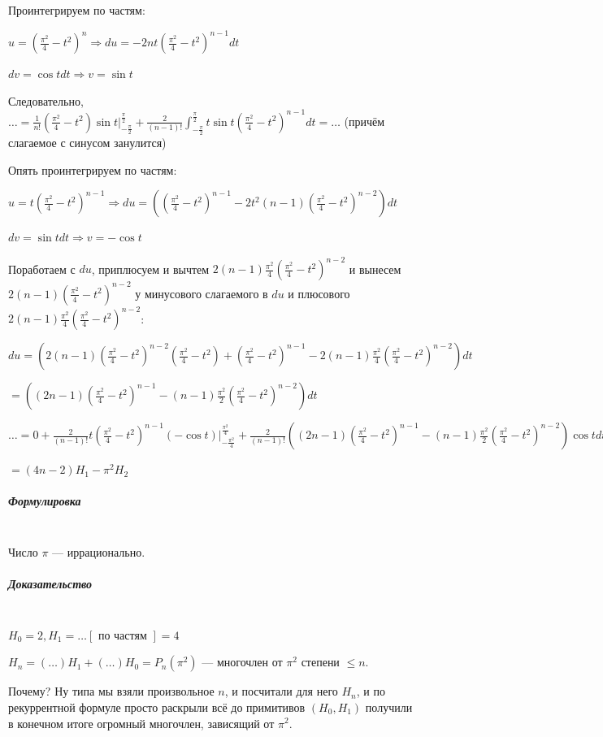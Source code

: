 \documentclass{article}
\let\vanillasubparagraph\subparagraph
\renewcommand{\subparagraph}[1]{\vanillasubparagraph{#1}\mbox{}\\}
\begin{document}
Проинтегрируем по частям:

$u = \left(\frac{\pi^2}{4} - t^2\right)^n \Rightarrow du = -2nt\left(\frac{\pi^2}{4} - t^2\right)^{n - 1}dt$

$dv = \cos t dt \Rightarrow v = \sin t$

Следовательно, $\ldots = \frac{1}{n!}\left(\frac{\pi^2}{4} - t^2\right)\sin t|_{-\frac{\pi}{2}}^{\frac{\pi}{2}} + \frac{2}{(n - 1)!}\int_{-\frac{\pi}{2}}^{\frac{\pi}{2}}{t\sin t \left(\frac{\pi^2}{4} - t^2\right)^{n - 1}dt} = \ldots$ (причём слагаемое с синусом занулится)

Опять проинтегрируем по частям:

$u = t\left(\frac{\pi^2}{4} - t^2\right)^{n - 1} \Rightarrow du = \left(\left(\frac{\pi^2}{4} - t^2\right)^{n - 1} - 2t^2(n - 1)\left(\frac{\pi^2}{4} - t^2\right)^{n - 2}\right)dt$

$dv = \sin t dt \Rightarrow v = -\cos t$

Поработаем с $du$, приплюсуем и вычтем $2(n - 1)\frac{\pi^2}{4}\left(\frac{\pi^2}{4} - t^2\right)^{n - 2}$ и вынесем $2(n - 1)\left(\frac{\pi^2}{4} - t^2\right)^{n - 2}$ у минусового слагаемого в $du$ и плюсового $2(n - 1)\frac{\pi^2}{4}\left(\frac{\pi^2}{4} - t^2\right)^{n - 2}$:

$du = \left( 2(n - 1)\left( \frac{\pi^2}{4} - t^2\right)^{n - 2}\left(\frac{\pi^2}{4} - t^2\right) + \left(\frac{\pi^2}{4} - t^2\right)^{n - 1} - 2(n - 1)\frac{\pi^2}{4}\left(\frac{\pi^2}{4} - t^2\right)^{n - 2}\right)dt$

$= \left((2n - 1)\left(\frac{\pi^2}{4} - t^2\right)^{n - 1} - (n - 1)\frac{\pi^2}{2}\left(\frac{\pi^2}{4} - t^2\right)^{n - 2}\right)dt$

$\ldots = 0 + \frac{2}{(n - 1)!}t\left(\frac{\pi^2}{4} - t^2\right)^{n - 1}(-\cos t)|_{-\frac{\pi^2}{4}}^{\frac{\pi^2}{4}} + \frac{2}{(n -1)!}\left((2n - 1)\left(\frac{\pi^2}{4} - t^2\right)^{n - 1} - (n - 1)\frac{\pi^2}{2}\left(\frac{\pi^2}{4} - t^2\right)^{n - 2}\right)\cos tdt$

$= (4n - 2)H_1 - \pi^2H_2$


\subparagraph{Формулировка}

Число $\pi$ --- иррационально.

\subparagraph{Доказательство}

$H_0 = 2, H_1 = \ldots [\text{ по частям }] = 4$

$H_n = (\ldots)H_1 + (\ldots)H_0 = P_n(\pi^2)$ --- многочлен от $\pi^2$ степени $\le n$.

Почему? Ну типа мы взяли произвольное $n$, и посчитали для него $H_n$, и по рекуррентной формуле просто раскрыли всё до примитивов $(H_0, H_1)$  получили в конечном итоге огромный многочлен, зависящий от $\pi^2$.
\end{document}
